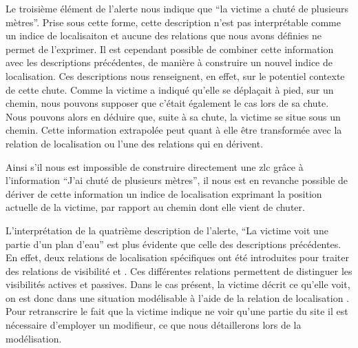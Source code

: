 Le troisième élément de l'alerte nous indique que \enquote{la victime
  a chuté de plusieurs mètres}. Prise sous cette forme, cette
description n'est pas interprétable comme un indice de localisaiton et
aucune des relations que nous avons définies ne permet de
l'exprimer. Il est cependant possible de combiner cette information
avec les descriptions précédentes, de manière à construire un nouvel
indice de localisation. Ces descriptions nous renseignent, en effet,
sur le potentiel contexte de cette chute. Comme la victime a indiqué
qu'elle se déplaçait à pied, sur un chemin, nous pouvons supposer que
c'était également le cas lors de sa chute. Nous pouvons alors en
déduire que, suite à sa chute, la victime se situe sous un
chemin. Cette information extrapolée peut quant à elle être
transformée avec la relation de localisation
 ou l'une des relations qui en dérivent.

 Ainsi s'il nous est impossible de
construire directement une \ac{zlc} grâce à l'information
\enquote{J'ai chuté de plusieurs mètres}, il nous est en revanche
possible de dériver de cette information un indice de localisation
exprimant la position actuelle de la victime, par rapport au chemin
dont elle vient de chuter.




L'interprétation de la quatrième description de l'alerte, \enquote{La
  victime voit une partie d'un plan d'eau} est plus évidente que celle
des descriptions précédentes. En effet, deux relations de localisation
spécifiques ont été introduites pour traiter des relations de
visibilité  et
. Ces différentes relations permettent de
distinguer les visibilités actives et passives. Dans le cas présent,
la victime décrit ce qu'elle voit, on est donc dans une situation
modélisable à l'aide de la relation de localisation
.
%
Pour retranscrire le fait que la victime indique ne voir qu'une partie
du site il est nécessaire d'employer un modifieur, ce que nous
détaillerons lors de la modélisation.



